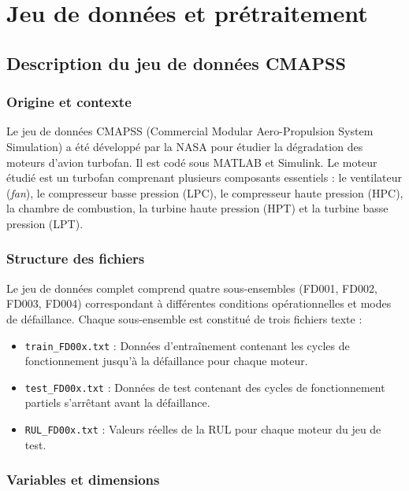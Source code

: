 \documentclass[12pt,a4paper]{report}
\theoremstyle{definition}
\begin{document}
\chapter{Jeu de données et prétraitement}\label{chap:donnees}

\section{Description du jeu de données CMAPSS}

\subsection{Origine et contexte}

Le jeu de données CMAPSS (Commercial Modular Aero-Propulsion System Simulation) a été développé par la NASA pour étudier la dégradation des moteurs d'avion turbofan. Il est codé sous MATLAB et Simulink. Le moteur étudié est un turbofan comprenant plusieurs composants essentiels : le ventilateur (\emph{fan}), le compresseur basse pression (LPC), le compresseur haute pression (HPC), la chambre de combustion, la turbine haute pression (HPT) et la turbine basse pression (LPT).

\subsection{Structure des fichiers}

Le jeu de données complet comprend quatre sous-ensembles (FD001, FD002, FD003, FD004) correspondant à différentes conditions opérationnelles et modes de défaillance. Chaque sous-ensemble est constitué de trois fichiers texte :
\begin{itemize}
    \item \texttt{train\_FD00x.txt} : Données d'entraînement contenant les cycles de fonctionnement jusqu'à la défaillance pour chaque moteur.
    \item \texttt{test\_FD00x.txt} : Données de test contenant des cycles de fonctionnement partiels s'arrêtant avant la défaillance.
    \item \texttt{RUL\_FD00x.txt} : Valeurs réelles de la RUL pour chaque moteur du jeu de test.
\end{itemize}

\subsection{Variables et dimensions}
\end{document}
